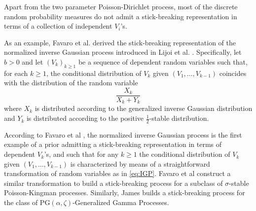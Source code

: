 Apart from the two parameter Poisson-Dirichlet process, most of the discrete random probability measures do not admit a stick-breaking representation in terms of a collection of independent $V_i$'s.%

As an example, Favaro et al. \cite{Favaro:2012ht} derived the stick-breaking representation of the normalized inverse Gaussian process introduced in Lijoi et al. \cite{Lijoi:2005ku}. Specifically, let $b > 0$ and let $(V_k)_{k \ge 1}$ be a sequence of dependent random variables such that, for each $k \ge 1$, the conditional distribution of $V_k$ given $(V_1,\dots,V_{k-1})$ coincides with the distribution of the random variable
\begin{equation} \label{eq:IGP}
\frac{X_k}{X_k + Y_k}
\end{equation}
where $X_k$ is distributed according to the generalized inverse Gaussian distribution and $Y_k$ is distributed according to the positive $\frac{1}{2}$-stable distribution.

According to Favaro et al \cite{Favaro:2014bo}, the normalized inverse Gaussian process \cite{Favaro:2012ht} is the first example of a prior admitting a stick-breaking representation in terms of dependent  $V_k$'s, and such that for any $k \ge 1$ the conditional distribution of $V_k$ given $(V_1,\dots,V_{k-1})$ is characterized by means of a straightforward transformation of random variables as in \ref{eq:IGP}.
Favaro et al \cite{Favaro:2014bo} construct a similar transformation to build a stick-breaking process for a subclass of $\sigma$-stable Poisson-Kingman processes.
Similarly, James \cite{James:2013uk} builds a stick-breaking process for the class of $\text{PG}(\alpha,\zeta)$-Generalized Gamma Processes.

